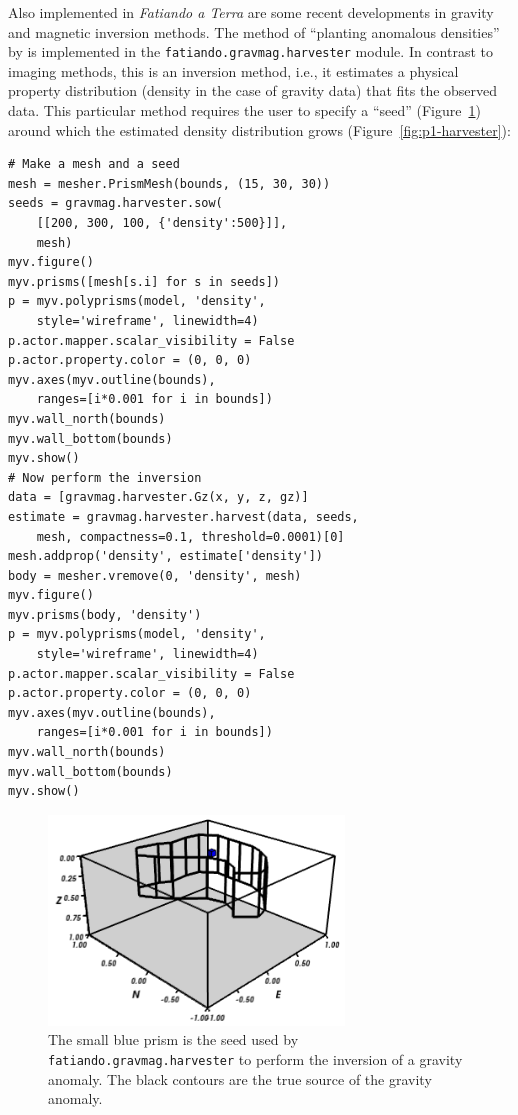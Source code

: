 Also implemented in \textit{Fatiando a Terra} are some recent developments in
gravity and magnetic inversion methods. The method of ``planting
anomalous densities'' by \citet{uieda2012} is implemented in the
\texttt{fatiando.gravmag.harvester} module. In contrast to imaging
methods, this is an inversion method, i.e., it estimates a physical
property distribution (density in the case of gravity data) that fits
the observed data. This particular method requires the user to specify a
``seed'' (Figure~\ref{fig:p1-seed}) around which the estimated density
distribution grows (Figure~\ref{fig:p1-harvester}):

\begin{verbatim}
# Make a mesh and a seed
mesh = mesher.PrismMesh(bounds, (15, 30, 30))
seeds = gravmag.harvester.sow(
    [[200, 300, 100, {'density':500}]],
    mesh)
myv.figure()
myv.prisms([mesh[s.i] for s in seeds])
p = myv.polyprisms(model, 'density',
    style='wireframe', linewidth=4)
p.actor.mapper.scalar_visibility = False
p.actor.property.color = (0, 0, 0)
myv.axes(myv.outline(bounds),
    ranges=[i*0.001 for i in bounds])
myv.wall_north(bounds)
myv.wall_bottom(bounds)
myv.show()
# Now perform the inversion
data = [gravmag.harvester.Gz(x, y, z, gz)]
estimate = gravmag.harvester.harvest(data, seeds,
    mesh, compactness=0.1, threshold=0.0001)[0]
mesh.addprop('density', estimate['density'])
body = mesher.vremove(0, 'density', mesh)
myv.figure()
myv.prisms(body, 'density')
p = myv.polyprisms(model, 'density',
    style='wireframe', linewidth=4)
p.actor.mapper.scalar_visibility = False
p.actor.property.color = (0, 0, 0)
myv.axes(myv.outline(bounds),
    ranges=[i*0.001 for i in bounds])
myv.wall_north(bounds)
myv.wall_bottom(bounds)
myv.show()
\end{verbatim}

\begin{figure}
    \centering
    \includegraphics[width=0.7\textwidth]{figures/paper-fatiando/gravmag_harvester_seed}
    \caption{
        The small blue prism is the seed used by
        \texttt{fatiando.gravmag.harvester} to perform the inversion of a
        gravity anomaly. The black contours are the true source of the gravity
        anomaly.
    }
    \label{fig:p1-seed}
\end{figure}

